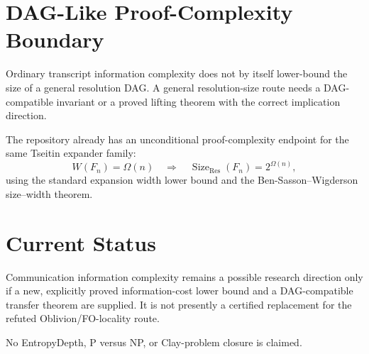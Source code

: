 \documentclass[11pt]{article}
\begin{document}
\section*{DAG-Like Proof-Complexity Boundary}

Ordinary transcript information complexity does not by itself lower-bound the
size of a general resolution DAG.  A general resolution-size route needs a
DAG-compatible invariant or a proved lifting theorem with the correct
implication direction.

The repository already has an unconditional proof-complexity endpoint for the
same Tseitin expander family:
\[
W(F_n)=\Omega(n)
\quad\Longrightarrow\quad
\operatorname{Size}_{\mathrm{Res}}(F_n)=2^{\Omega(n)},
\]
using the standard expansion width lower bound and the
Ben-Sasson--Wigderson size--width theorem.

\section*{Current Status}

Communication information complexity remains a possible research direction
only if a new, explicitly proved information-cost lower bound and a
DAG-compatible transfer theorem are supplied.  It is not presently a certified
replacement for the refuted Oblivion/FO-locality route.

No EntropyDepth, P versus NP, or Clay-problem closure is claimed.
\end{document}
